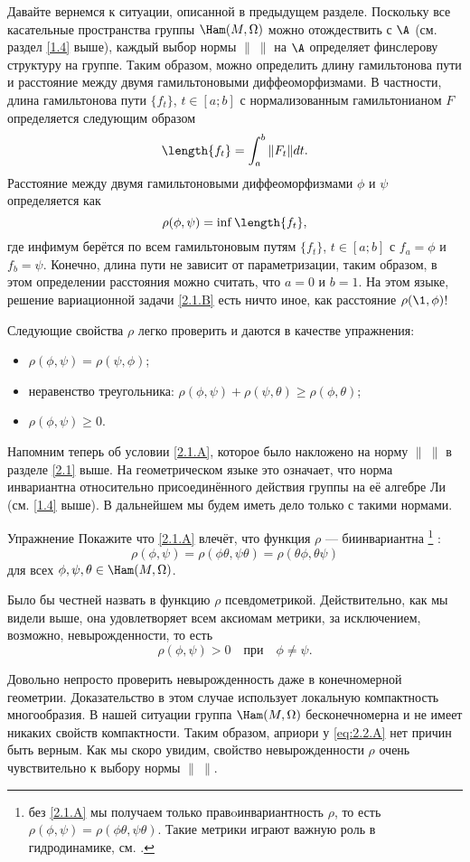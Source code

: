 Давайте вернемся к ситуации, описанной в предыдущем разделе.
Поскольку все касательные пространства группы $\Ham(M, \Omega)$ можно отождествить с $\A$ (см. раздел \ref{1.4} выше), каждый выбор нормы $\|\ \|$ на $\A$ определяет финслерову структуру на группе.
Таким образом, можно определить длину гамильтонова пути и расстояние между двумя гамильтоновыми диффеоморфизмами.
В частности, длина гамильтонова пути $\{f_t\}$, $t \in [a; b]$ с нормализованным гамильтонианом $F$ определяется следующим образом 
\[\length\{f_t\}=\int_a^b \| F_t \| dt.\]
Расстояние между двумя гамильтоновыми диффеоморфизмами $\phi$ и $\psi$ определяется как
\[\rho (\phi, \psi) = \inf \length \{f_t\},\] 
где инфимум берётся по всем гамильтоновым путям $\{f_t\}$, $t \in [a; b]$ с $f_a = \phi$ и $f_b = \psi$.
Конечно, длина пути не зависит от параметризации, таким образом, в этом определении расстояния можно считать, что $a = 0$ и $b = 1$.
На этом языке, решение вариационной задачи
\ref{2.1.B} есть ничто иное, как расстояние $\rho (\1, \phi)$!

Следующие свойства $\rho$ легко проверить и даются в качестве упражнения:
\begin{itemize}
\item $\rho (\phi, \psi) = \rho (\psi, \phi)$;
\item неравенство треугольника: $\rho (\phi, \psi) + \rho (\psi, \theta) \ge \rho (\phi, \theta)$;
\item $\rho (\phi, \psi) \ge 0$.
\end{itemize}

Напомним теперь об условии \ref{2.1.A}, которое было накложено на норму $\|\ \|$ в разделе \ref{2.1} выше.
На геометрическом языке это означает, что норма инвариантна относительно присоединённого действия группы на её алгебре Ли (см. \ref{1.4} выше).
В дальнейшем мы будем иметь дело только с такими нормами.

\begin{thm*}{Упражнение}
Покажите что \ref{2.1.A} влечёт, что функция $\rho$ --- биинвариантна%
\footnote{без \ref{2.1.A} мы получаем только правoинвариантность $\rho$, то есть $\rho (\phi, \psi) = \rho (\phi\theta, \psi\theta)$.
Такие метрики играют важную роль в гидродинамике, см. \cite{AK}.}%
:
\[\rho (\phi, \psi) = \rho (\phi \theta, \psi \theta) = \rho (\theta\phi, \theta\psi)\]
для всех $\phi, \psi, \theta \in \Ham (M, \Omega)$.
\end{thm*}

Было бы честней назвать в функцию $\rho$ псевдометрикой.
Действительно, как мы видели выше, она удовлетворяет всем аксиомам метрики, за исключением, возможно, невырожденности, то есть 
\begin{equation}
\rho (\phi, \psi)> 0
\quad\text{при}\quad
\phi \ne \psi.
\label{eq:2.2.A}
\end{equation}

Довольно непросто проверить невырожденность даже в конечномерной геометрии.
Доказательство в этом случае использует локальную компактность многообразия.
В нашей ситуации группа $\Ham (M, \Omega)$ бесконечномерна и не имеет никаких свойств компактности.
Таким образом, априори у \ref{eq:2.2.A} нет причин быть верным.
Как мы скоро увидим, свойство невырожденности $\rho$ очень чувствительно к выбору нормы $\|\ \|$.


